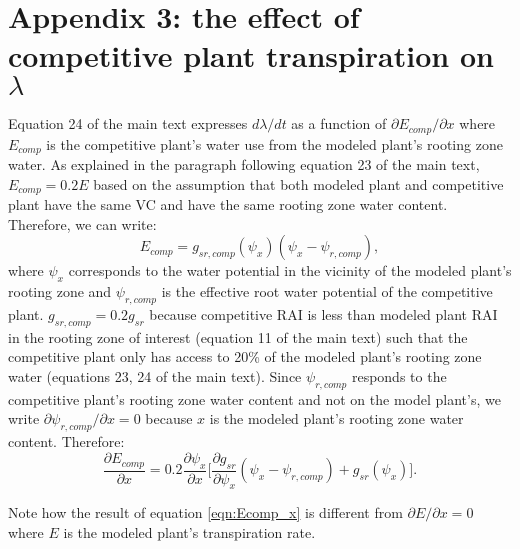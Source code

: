 \documentclass[utf8]{frontiers_suppmat} %
\begin{document}
\section*{Appendix 3: the effect of competitive plant transpiration on $\lambda$}
Equation 24 of the main text expresses $d \lambda / dt$ as a function of $\partial E_{comp} / \partial x$ where $E_{comp}$ is the competitive plant's water use from the modeled plant's rooting zone water. As explained in the paragraph following equation 23 of the main text, $E_{comp}=0.2E$ based on the assumption that both modeled plant and competitive plant have the same VC and have the same rooting zone water content. Therefore, we can write:
\begin{equation}
    \label{eqn:E_comp}
    E_{comp} = g_{sr,comp}(\psi_x)(\psi_x - \psi_{r,comp}),
\end{equation}
where $\psi_x$ corresponds to the water potential in the vicinity of the modeled plant's rooting zone and $\psi_{r,comp}$ is the effective root water potential of the competitive plant. $g_{sr,comp} = 0.2 g_{sr}$ because competitive RAI is less than modeled plant RAI in the rooting zone of interest (equation 11 of the main text) such that the competitive plant only has access to 20\% of the modeled plant's rooting zone water (equations 23, 24 of the main text). Since $\psi_{r,comp}$ responds to the competitive plant's rooting zone water content and not on the model plant's, we write $\partial \psi_{r,comp} / \partial x = 0$ because $x$ is the modeled plant's rooting zone water content. Therefore:
\begin{equation}
    \label{eqn:Ecomp_x}
    \frac{\partial E_{comp}}{\partial x} = 0.2 \frac{\partial \psi_x}{\partial x} \Bigg[ \frac{\partial g_{sr}}{\partial \psi_x} (\psi_x - \psi_{r,comp}) + g_{sr}(\psi_x) \Bigg].
\end{equation}

Note how the result of equation \ref{eqn:Ecomp_x} is different from $\partial E / \partial x = 0$ where $E$ is the modeled plant's transpiration rate.

\end{document}
